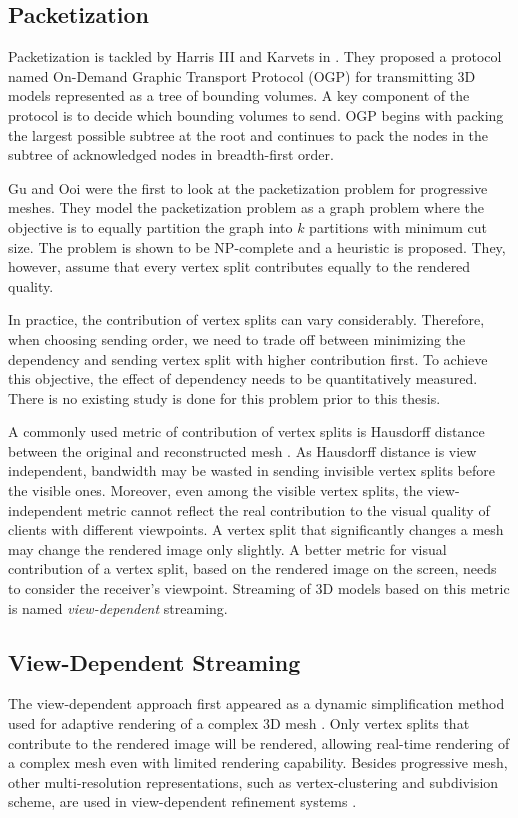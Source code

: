     \subsection{Packetization}
    \label{ss:intro:packetization}
    Packetization is tackled by
    Harris III and Karvets in \cite{harris:design}.   
    They proposed a protocol named On-Demand Graphic Transport Protocol (OGP)
    for transmitting 3D models represented as a tree of bounding volumes.
    A key component of the protocol is to decide which bounding volumes
    to send.  OGP begins with packing the largest possible subtree at
    the root and continues to pack the nodes in the subtree of
    acknowledged nodes in breadth-first order.  
    
    Gu and Ooi \cite{Gu:Packetization} were the first to look at
    the packetization problem for progressive meshes.  They model
    the packetization problem as a graph problem where the objective
    is to equally partition the graph into $k$ partitions with minimum
    cut size.  The problem is shown to be NP-complete and a heuristic
    is proposed.  They, however, assume that every vertex split contributes 
    equally to the rendered quality.
    
    In practice, the contribution of vertex splits can
    vary considerably. Therefore, when choosing sending order, we
    need to trade off between minimizing the dependency and sending 
    vertex split with higher contribution first. To achieve this objective,
    the effect of dependency needs to be quantitatively measured.
    There is no existing study is done for this problem
    prior to this thesis.

    A commonly used metric of contribution of vertex splits is 
    Hausdorff distance between the original and reconstructed mesh \cite{cignoni98metro}.
    As Hausdorff distance is view independent, 
    bandwidth may be wasted in sending invisible vertex splits
    before the visible ones. Moreover, even among the visible vertex splits,
    the view-independent metric cannot reflect the real contribution to the visual quality of
    clients with different viewpoints. A vertex split that significantly
    changes a mesh may change the rendered image 
    only slightly.  A better metric for visual contribution of a vertex split,
    based on the rendered image on the screen, 
    needs to consider the receiver's viewpoint.
    Streaming of 3D models based on this metric is named \emph{view-dependent} streaming.

    \subsection{View-Dependent Streaming}
    The view-dependent approach first appeared as 
    a dynamic simplification method used for adaptive rendering of a complex 3D mesh
    \cite{258843, 258847}. Only vertex splits that contribute to the rendered
    image will be rendered, allowing real-time rendering of a complex mesh
    even with limited rendering capability.
    Besides progressive mesh, other multi-resolution representations, 
    such as vertex-clustering  and subdivision scheme,
    are used in view-dependent refinement systems \cite{245627, efficient:Alliez,602344}.

